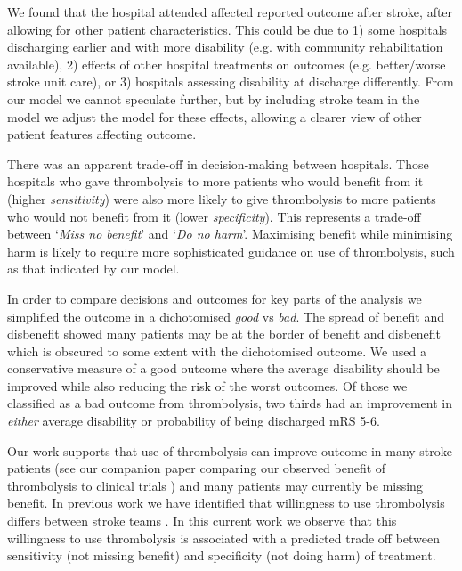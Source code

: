 We found that the hospital attended affected reported outcome after stroke, after allowing for other patient characteristics. This could be due to 1) some hospitals discharging earlier and with more disability (e.g. with community rehabilitation available), 2) effects of other hospital treatments on outcomes (e.g. better/worse stroke unit care), or 3) hospitals assessing disability at discharge differently. From our model we cannot speculate further, but by including stroke team in the model we adjust the model for these effects, allowing a clearer view of other patient features affecting outcome.

There was an apparent trade-off in decision-making between hospitals. Those hospitals who gave thrombolysis to more patients who would benefit from it (higher \textit{sensitivity}) were also more likely to give thrombolysis to more patients who would not benefit from it (lower \textit{specificity}). This represents a trade-off between `\textit{Miss no benefit}' and `\textit{Do no harm}'. Maximising benefit while minimising harm is likely to require more sophisticated guidance on use of thrombolysis, such as that indicated by our model.

In order to compare decisions and outcomes for key parts of the analysis we simplified the outcome in a dichotomised \textit{good} vs \textit{bad}. The spread of benefit and disbenefit showed many patients may be at the border of benefit and disbenefit which is obscured to some extent with the dichotomised outcome. We used a conservative measure of a good outcome where the average disability should be improved while also reducing the risk of the worst outcomes. Of those we classified as a bad outcome from thrombolysis, two thirds had an improvement in \textit{either} average disability or probability of being discharged mRS 5-6.  


Our work supports that use of thrombolysis can improve outcome in many stroke patients (see our companion paper comparing our observed benefit of thrombolysis to clinical trials \cite{pearn_thrombolysis_2024}) and many patients may currently be missing benefit. In previous work we have identified that willingness to use thrombolysis differs between stroke teams \cite{allen_use_2022, allen_using_2022}. In this current work we observe that this willingness to use thrombolysis is associated with a predicted trade off between sensitivity (not missing benefit) and specificity (not doing harm) of treatment.

